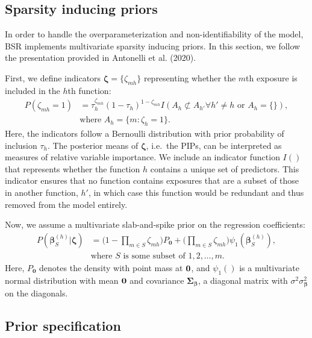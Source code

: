 \documentclass[12pt, twoside]{amherstthesis}
\begin{document}
\hypertarget{sparsity-inducing-priors}{%
\subsection{Sparsity inducing priors}\label{sparsity-inducing-priors}}

In order to handle the overparameterization and non-identifiability of the model, BSR implements multivariate sparsity inducing priors. In this section, we follow the presentation provided in Antonelli et al. (2020).

First, we define indicators \(\boldsymbol\zeta=\{\zeta_{mh}\}\) representing whether the \(m\)th exposure is included in the \(h\)th function:
\begin{align*}
P(\zeta_{mh}=1) &= \tau_h^{\zeta_{mh}}(1-\tau_h)^{1-\zeta_{mh}} 
I(A_h\not\subset A_{h'}\forall h'\neq h \textrm{ or } A_h=\{\}),\\
&\textrm{where } A_h=\{m:\zeta_h=1\}.
\end{align*}
\noindent Here, the indicators follow a Bernoulli distribution with prior probability of inclusion \(\tau_h\). The posterior means of \(\boldsymbol\zeta\), i.e.~the PIPs, can be interpreted as measures of relative variable importance. We include an indicator function \(I()\) that represents whether the function \(h\) contains a unique set of predictors. This indicator ensures that no function contains exposures that are a subset of those in another function, \(h'\), in which case this function would be redundant and thus removed from the model entirely.

Now, we assume a multivariate slab-and-spike prior on the regression coefficients:
\begin{align*}
P(\boldsymbol\beta_S^{(h)}|\boldsymbol\zeta) &= \bigg(1-\prod_{m\in S}\zeta_{mh}\bigg)P_{\textbf{0}} +
\bigg(\prod_{m\in S}\zeta_{mh}\bigg) \psi_1(\boldsymbol\beta_S^{(h)}), \\
&\textrm{where } S \textrm{ is some subset of } {1, 2, \dots, m}.
\end{align*}
\noindent Here, \(P_{\textbf{0}}\) denotes the density with point mass at \(\textbf0\), and \(\psi_1()\) is a multivariate normal distribution with mean \(\textbf0\) and covariance \(\boldsymbol\Sigma_{\boldsymbol\beta}\), a diagonal matrix with \(\sigma^2\sigma_{\boldsymbol\beta}^2\) on the diagonals.

\hypertarget{bsrprior}{%
\subsection{Prior specification}\label{bsrprior}}
\end{document}
